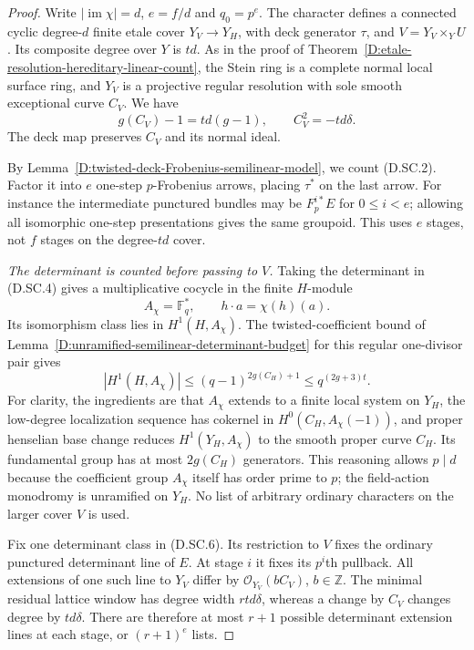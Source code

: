 \begin{proof}
Write $|\operatorname{im}\chi|=d$, $e=f/d$ and $q_0=p^e$.
The character defines a connected cyclic degree-$d$ finite
etale cover $Y_V\to Y_H$, with deck generator $\tau$,
and $V=Y_V\times_Y U$. Its composite degree over $Y$
is $td$. As in the proof of
Theorem~\ref{D:etale-resolution-hereditary-linear-count},
the Stein ring is a complete normal local surface ring,
and $Y_V$ is a projective regular resolution with sole
smooth exceptional curve $C_V$. We have
\[
       g(C_V)-1=td(g-1),\qquad C_V^2=-td\delta.          \tag{D.SC.5}
\]
The deck map preserves $C_V$ and its normal ideal.

By Lemma~\ref{D:twisted-deck-Frobenius-semilinear-model},
we count (D.SC.2). Factor it into $e$ one-step
$p$-Frobenius arrows, placing $\tau^*$ on the last arrow.
For instance the intermediate punctured bundles may be
$F_p^{i*}E$ for $0\leq i<e$; allowing all isomorphic
one-step presentations gives the same groupoid. This uses
$e$ stages, not $f$ stages on the degree-$td$ cover.

\emph{The determinant is counted before passing to $V$.}
Taking the determinant in (D.SC.4) gives a multiplicative
cocycle in the finite $H$-module
\[
           A_\chi=\mathbb F_q^*,\qquad
                    h\cdot a=\chi(h)(a).
\]
Its isomorphism class lies in $H^1(H,A_\chi)$. The
twisted-coefficient bound of Lemma~\ref{D:unramified-semilinear-determinant-budget}
for this regular one-divisor pair gives
\[
 |H^1(H,A_\chi)|
       \leq(q-1)^{2g(C_H)+1}\leq q^{(2g+3)t}.          \tag{D.SC.6}
\]
For clarity, the ingredients are that $A_\chi$ extends
to a finite local system on $Y_H$, the low-degree
localization sequence has cokernel in
$H^0(C_H,A_\chi(-1))$, and proper henselian base change
reduces $H^1(Y_H,A_\chi)$ to the smooth proper curve
$C_H$. Its fundamental group has at most $2g(C_H)$
generators. This reasoning allows $p\mid d$ because
the coefficient group $A_\chi$ itself has order prime
to $p$; the field-action monodromy is unramified on $Y_H$.
No list of arbitrary ordinary characters on the larger
cover $V$ is used.

Fix one determinant class in (D.SC.6). Its restriction to
$V$ fixes the ordinary punctured determinant line of $E$.
At stage $i$ it fixes its $p^i$th pullback. All extensions
of one such line to $Y_V$ differ by
$\mathcal O_{Y_V}(bC_V)$, $b\in\mathbb Z$. The minimal
residual lattice window has degree width $rtd\delta$,
whereas a change by $C_V$ changes degree by $td\delta$.
There are therefore at most $r+1$ possible determinant
extension lines at each stage, or $(r+1)^e$ lists.


\end{proof}
